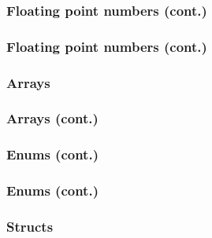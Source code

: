 \documentclass[aspectratio=169]{beamer}
\begin{document}
\begin{frame}
  \frametitle{Floating point numbers (cont.)}
\end{frame}

\begin{frame}
  \frametitle{Floating point numbers (cont.)}

\end{frame}


\begin{frame}
  \frametitle{Arrays}
\end{frame}

\begin{frame}
  \frametitle{Arrays (cont.)}
\end{frame}

\begin{frame}
  \frametitle{Enums (cont.)}
\end{frame}

\begin{frame}
  \frametitle{Enums (cont.)}
\end{frame}

\begin{frame}
  \frametitle{Structs}
\end{frame}
\end{document}
